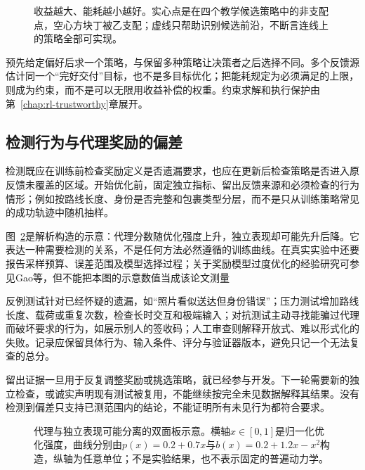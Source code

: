 \begin{figure}[htbp]
  \centering
  
  \caption{收益越大、能耗越小越好。实心点是在四个教学候选策略中的非支配点，空心方块丁被乙支配；虚线只帮助识别候选前沿，不断言连线上的策略全部可实现。}
  \label{fig:rl-reward-pareto}
\end{figure}

预先给定偏好后求一个策略，与保留多种策略让决策者之后选择不同。多个反馈源估计同一个“完好交付”目标，也不是多目标优化；把能耗规定为必须满足的上限，则成为约束，而不是可以无限用收益补偿的权重。约束求解和执行保护由第~\ref{chap:rl-trustworthy}章展开。

\subsection{检测行为与代理奖励的偏差}
\label{sec:rl-reward-detection}

检测既应在训练前检查奖励定义是否遗漏要求，也应在更新后检查策略是否进入原反馈未覆盖的区域。开始优化前，固定独立指标、留出反馈来源和必须检查的行为情形；例如按路线长度、身份是否完整和包裹类型分层，而不是只从训练策略常见的成功轨迹中随机抽样。

图~\ref{fig:rl-reward-overoptimization}是解析构造的示意：代理分数随优化强度上升，独立表现却可能先升后降。它表达一种需要检测的关系，不是任何方法必然遵循的训练曲线。在真实实验中还要报告采样预算、误差范围及模型选择过程；关于奖励模型过度优化的经验研究可参见Gao等，但不能把本图的示意数值当成该论文测量

反例测试针对已经怀疑的遗漏，如“照片看似送达但身份错误”；压力测试增加路线长度、载荷或重复次数，检查长时交互和极端输入；对抗测试主动寻找能骗过代理而破坏要求的行为，如展示别人的签收码；人工审查则解释开放式、难以形式化的失败。记录应保留具体行为、输入条件、评分与验证器版本，避免只记一个无法复查的总分。

留出证据一旦用于反复调整奖励或挑选策略，就已经参与开发。下一轮需要新的独立检查，或诚实声明现有测试被复用，不能继续按完全未见数据解释其结果。没有检测到偏差只支持已测范围内的结论，不能证明所有未见行为都符合要求。

\begin{figure}[htbp]
  \centering
  
  \caption{代理与独立表现可能分离的双面板示意。横轴$x\in[0,1]$是归一化优化强度，曲线分别由$p(x)=0.2+0.7x$与$b(x)=0.2+1.2x-x^2$构造，纵轴为任意单位；不是实验结果，也不表示固定的普遍动力学。}
  \label{fig:rl-reward-overoptimization}
\end{figure}

